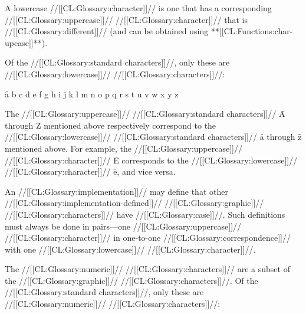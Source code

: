\endsubsubsubsection%


A lowercase //[[CL:Glossary:character]]// is one that has a corresponding 
//[[CL:Glossary:uppercase]]// //[[CL:Glossary:character]]// that is //[[CL:Glossary:different]]// 
(and can be obtained using **[[CL:Functions:char-upcase]]**).

Of the //[[CL:Glossary:standard characters]]//, only these are //[[CL:Glossary:lowercase]]// //[[CL:Glossary:characters]]//:

\f{a b c d e f g h i j k l m n o p q r s t u v w x y z}

\endsubsubsubsection%


The //[[CL:Glossary:uppercase]]// //[[CL:Glossary:standard characters]]// \f{A} through \f{Z} mentioned above
respectively correspond to
the //[[CL:Glossary:lowercase]]// //[[CL:Glossary:standard characters]]// \f{a} through \f{z} mentioned above.
For example, the //[[CL:Glossary:uppercase]]// //[[CL:Glossary:character]]// \f{E} 
corresponds to the //[[CL:Glossary:lowercase]]// //[[CL:Glossary:character]]// \f{e}, and vice versa.

\endsubsubsubsection%


An //[[CL:Glossary:implementation]]// may define that other //[[CL:Glossary:implementation-defined]]//
//[[CL:Glossary:graphic]]// //[[CL:Glossary:characters]]// have //[[CL:Glossary:case]]//.  Such definitions must always
be done in pairs---one //[[CL:Glossary:uppercase]]// //[[CL:Glossary:character]]// in one-to-one 
//[[CL:Glossary:correspondence]]// with one //[[CL:Glossary:lowercase]]// //[[CL:Glossary:character]]//.

\endsubsubsubsection%

\endsubsubsection%


The //[[CL:Glossary:numeric]]// //[[CL:Glossary:characters]]// are
a subset of the //[[CL:Glossary:graphic]]// //[[CL:Glossary:characters]]//.
Of the //[[CL:Glossary:standard characters]]//, only these are //[[CL:Glossary:numeric]]// //[[CL:Glossary:characters]]//:

